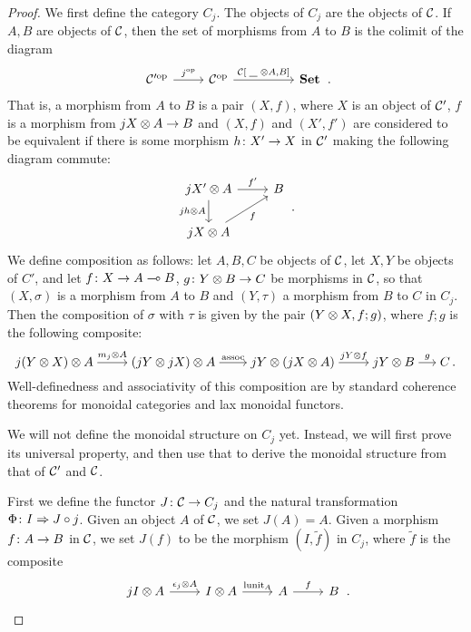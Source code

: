 \documentclass{article}
\begin{document}
\begin{proof}
  We first define the category $C_j$.  
  The objects of $C_j$ are the objects of ${\mathcal{C}}$.
  If $A,B$ are objects of ${\mathcal{C}}$, then the set of morphisms from $A$ to $B$ is the colimit of the diagram
  \[
    \begin{tikzcd}
      \oppcat{\C'} \arrow[r, "\oppcat j"]
        & \oppcat\C \arrow[r, "{\C[\blank\tensor A, B]}"]
          &[24pt] \Set
    \end{tikzcd}\,.
    \]
  That is, a morphism from $A$ to $B$ is a pair $(X, f)$, where $X$ is an object of ${\mathcal{C}}'$, $f$ is a morphism from $jX \otimes A \to B$ and $(X, f)$ and $(X', f')$ are considered to be equivalent if there is some morphism $h\colon X'\to X$ in ${\mathcal{C}}'$ making the following diagram commute:
  \[
    \begin{tikzcd}
      j X' \tensor A \arrow[r, "f'"] \arrow[d, "j h \tensor A"']
        & B \\
      j X \tensor A \arrow[ur, "f"']
        &
    \end{tikzcd}\,.
    \]
  We define composition as follows: let $A,B,C$ be objects of ${\mathcal{C}}$, let $X,Y$ be objects of $C'$, and let $f\colon X\to A \multimap B$, $g\colon Y\otimes B\to C$ be morphisms in ${\mathcal{C}}$, so that $(X,\sigma)$ is a morphism from $A$ to $B$ and $(Y,\tau)$ a morphism from $B$ to $C$ in $C_j$.
  Then the composition of $\sigma$ with $\tau$ is given by the pair $(Y\otimes X,f;g)$, where $f;g$ is the following composite:
  \[
    \begin{tikzcd}[cramped]
      j(Y\tensor X)\tensor A \arrow[r, "m_j\tensor A"]
        & (jY \tensor jX) \tensor A \arrow[r, "\assoc"]
          &[-2pt] jY \tensor (jX \tensor A) \arrow[r, "jY \tensor f"]
            & jY \tensor B \arrow[r, "g"]
              &[-10pt] C
    \end{tikzcd}\,.
    \]
  Well-definedness and associativity of this composition are by standard coherence theorems for monoidal categories and lax monoidal functors.

  We will not define the monoidal structure on $C_j$ yet.  
  Instead, we will first prove its universal property, and then use that to derive the monoidal structure from that of ${\mathcal{C}}'$ and ${\mathcal{C}}$.  

  First we define the functor $J\colon {\mathcal{C}}\to C_j$ and the natural transformation $\Phi\colon I\Rightarrow J\circ j$.  
  Given an object $A$ of ${\mathcal{C}}$, we set $J(A) = A$.  
  Given a morphism $f\colon A \to B$ in ${\mathcal{C}}$, we set $J(f)$ to be the morphism $(I, \tilde{f})$ in $C_j$, where $\tilde{f}$ is the composite
  \[
    \begin{tikzcd}
      jI\tensor A \arrow[r, "\epsilon_j\tensor A"]
        & I\tensor A \arrow[r, "\lunit_A"]
          & A \arrow[r, "f"]
            & B
    \end{tikzcd}\,.
    \]


\end{proof}
\end{document}
